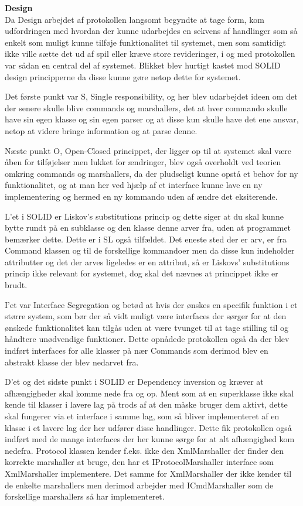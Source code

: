 \textbf{Design}\\

Da Design arbejdet af protokollen langsomt begyndte at tage form, kom udfordringen med hvordan der kunne udarbejdes en sekvens af handlinger som så enkelt som muligt kunne tilføje funktionalitet til systemet, men som samtidigt ikke ville sætte det ud af spil eller kræve store revideringer, i og med protokollen var sådan en central del af systemet. Blikket blev hurtigt kastet mod SOLID design principperne da disse kunne gøre netop dette for systemet.

Det første punkt var S, Single responsibility, og her blev udarbejdet ideen om det der senere skulle blive commands og marshallers, det at hver commando skulle have sin egen klasse og sin egen parser og at disse kun skulle have det ene ansvar, netop at videre bringe information og at parse denne.

Næste punkt O, Open-Closed princippet, der ligger op til at systemet skal være åben for tilføjelser men lukket for ændringer, blev også overholdt ved teorien omkring commands og marshallers, da der pludseligt kunne opstå et behov for ny funktionalitet, og at man her ved hjælp af et interface kunne lave en ny implementering og hermed en ny kommando uden af ændre det eksiterende.

L'et i SOLID er Liskov's substitutions princip og dette siger at du skal kunne bytte rundt på en subklasse og den klasse denne arver fra, uden at programmet bemærker dette. Dette er i \gls{SL} også tilfældet. Det eneste sted der er arv, er fra Command klassen og til de forskellige kommandoer men da disse kun indeholder attributter og det der arves ligeledes er en attribut, så er Liskovs' substitutions princip ikke relevant for systemet, dog skal det nævnes at princippet ikke er brudt.

I'et var Interface Segregation og betød at hvis der ønskes en specifik funktion i et større system, som bør der så vidt muligt være interfaces der sørger for at den ønskede funktionalitet kan tilgås uden at være tvunget til at tage stilling til og håndtere unødvendige funktioner. Dette opnådede protokollen også da der blev indført interfaces for alle klasser på nær Commands som derimod blev en abstrakt klasse der blev nedarvet fra.

D'et og det sidste punkt i SOLID er Dependency inversion og kræver at afhængigheder skal komme nede fra og op. Ment som at en superklasse ikke skal kende til klasser i lavere lag på trods af at den måske bruger dem aktivt, dette skal fungerer via et interface i samme lag, som så bliver implementeret af en klasse i et lavere lag der her udfører disse handlinger. Dette fik protokollen også indført med de mange interfaces der her kunne sørge for at alt afhængighed kom nedefra. Protocol klassen kender f.eks. ikke den XmlMarshaller der finder den korrekte marshaller at bruge, den har et IProtocolMarshaller interface som XmlMarshaller implementere. Det samme for XmlMarshaller der ikke kender til de enkelte marshallers men derimod arbejder med ICmdMarshaller som de forskellige marshallers så har implementeret.\\


